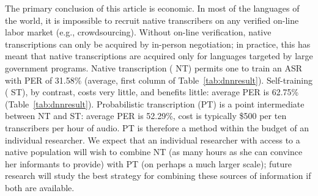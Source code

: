 The primary conclusion of this article is economic.  In
most of the languages of the world, it is impossible to recruit
native transcribers on any verified on-line labor market (e.g.,
crowdsourcing).  Without on-line verification, native transcriptions
can only be acquired by in-person negotiation; in practice, this has
meant that native transcriptions are acquired only for languages
targeted by large government programs.  Native transcription ({\sc
  NT}) permits one to train an ASR with PER of 31.58\% (average,
first column of Table~\ref{tab:dnnresult}).  Self-training ({\sc
  ST}), by contrast, costs very little, and benefits little: average
PER is 62.75\% (Table~\ref{tab:dnnresult}).  Probabilistic
transcription ({\sc PT}) is a point intermediate between {\sc NT}
and {\sc ST}: average PER is 52.29\%, cost is typically \$500 per
ten transcribers per hour of audio. {\sc PT} is therefore a method
within the budget of an individual researcher.  We expect that an
individual researcher with access to a native population will wish
to combine {\sc NT} (as many hours as she can convince her
informants to provide) with {\sc PT} (on perhaps a much larger
scale); future research will study the best strategy for combining
these sources of information if both are available.

